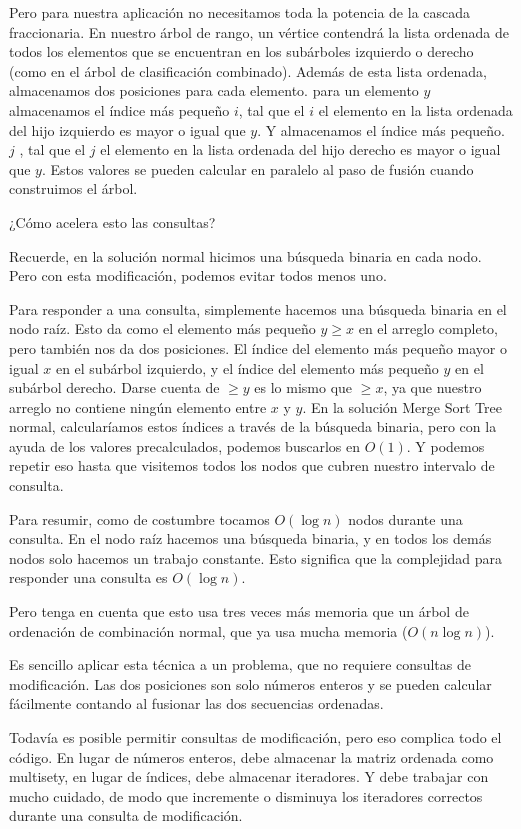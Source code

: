 Pero para nuestra aplicación no necesitamos toda la potencia de la cascada fraccionaria. En nuestro 
árbol de rango, un vértice contendrá la lista ordenada de todos los elementos que se encuentran en los 
subárboles izquierdo o derecho (como en el árbol de clasificación combinado). Además de esta lista 
ordenada, almacenamos dos posiciones para cada elemento. para un elemento $y$ almacenamos el índice más 
pequeño $i$, tal que el $i$ el elemento en la lista ordenada del hijo izquierdo es mayor o igual que 
$y$. Y almacenamos el índice más pequeño. $j$ , tal que el $j$ el elemento en la lista ordenada del 
hijo derecho es mayor o igual que $y$. Estos valores se pueden calcular en paralelo al paso de fusión cuando construimos el árbol.

¿Cómo acelera esto las consultas?

Recuerde, en la solución normal hicimos una búsqueda binaria en cada nodo. Pero con esta modificación, podemos evitar todos menos uno.

Para responder a una consulta, simplemente hacemos una búsqueda binaria en el nodo raíz. Esto da como 
el elemento más pequeño $y\ge x$ en el arreglo completo, pero también nos da dos posiciones. El índice 
del elemento más pequeño mayor o igual $x$ en el subárbol izquierdo, y el índice del elemento más 
pequeño $y$ en el subárbol derecho. Darse cuenta de $ \ge y$ es lo mismo que $\ge x$, ya que nuestro 
arreglo no contiene ningún elemento entre $x$ y $y$. En la solución Merge Sort Tree normal, 
calcularíamos estos índices a través de la búsqueda binaria, pero con la ayuda de los valores 
precalculados, podemos buscarlos en $O(1)$. Y podemos repetir eso hasta que visitemos todos los nodos 
que cubren nuestro intervalo de consulta.

Para resumir, como de costumbre tocamos $O(\log n)$ nodos durante una consulta. En el nodo raíz hacemos una búsqueda binaria, y en todos los demás nodos solo hacemos un trabajo constante. Esto significa que la complejidad para responder una consulta es $O(\log n)$.

Pero tenga en cuenta que esto usa tres veces más memoria que un árbol de ordenación de combinación normal, que ya usa mucha memoria ($O(n \log n)$).

Es sencillo aplicar esta técnica a un problema, que no requiere consultas de modificación. Las dos posiciones son solo números enteros y se pueden calcular fácilmente contando al fusionar las dos secuencias ordenadas.

Todavía es posible permitir consultas de modificación, pero eso complica todo el código. En lugar de números enteros, debe almacenar la matriz ordenada como multisety, en lugar de índices, debe almacenar iteradores. Y debe trabajar con mucho cuidado, de modo que incremente o disminuya los iteradores correctos durante una consulta de modificación.